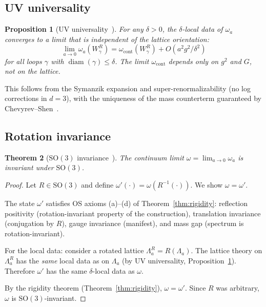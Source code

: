 \documentclass[11pt,a4paper]{article}
\theoremstyle{plain}
\newtheorem{theorem}{Theorem}[section]
\newtheorem{proposition}[theorem]{Proposition}
\theoremstyle{definition}
\theoremstyle{remark}
\newcommand{\diam}{\operatorname{diam}}
\newcommand{\SO}{\mathrm{SO}}
\begin{document}
\subsection{UV universality}

\begin{proposition}[UV universality~\cite{FontesEuclidean}]
\label{prop:uv_univ}
For any $\delta > 0$, the $\delta$-local data of $\omega_a$
converges to a limit that is independent of the
lattice orientation:
\begin{equation}
  \lim_{a \to 0} \omega_a(W_\gamma^R)
  = \omega_{\mathrm{cont}}(W_\gamma^R)
  + O(a^2 g^2 / \delta^2)
\end{equation}
for all loops $\gamma$ with $\diam(\gamma) \le \delta$.
The limit $\omega_{\mathrm{cont}}$ depends only on $g^2$
and $G$, not on the lattice.
\end{proposition}

This follows from the Symanzik expansion and
super-renormalizability (no log corrections in $d=3$),
with the uniqueness of the mass counterterm guaranteed
by Chevyrev--Shen~\cite{CS25}.

\subsection{Rotation invariance}

\begin{theorem}[$\SO(3)$ invariance~\cite{FontesEuclidean}]
\label{thm:rotation}
The continuum limit $\omega = \lim_{a \to 0} \omega_a$
is invariant under $\SO(3)$.
\end{theorem}

\begin{proof}
Let $R \in \SO(3)$ and define $\omega'(\cdot)
= \omega(R^{-1}(\cdot))$. We show $\omega = \omega'$.

The state $\omega'$ satisfies OS axioms (a)--(d) of
Theorem~\ref{thm:rigidity}: reflection positivity
(rotation-invariant property of the construction),
translation invariance (conjugation by $R$),
gauge invariance (manifest), and mass gap
(spectrum is rotation-invariant).

For the local data: consider a rotated lattice
$\Lambda_a^R = R(\Lambda_a)$. The lattice theory
on $\Lambda_a^R$ has the \emph{same} local data
as on $\Lambda_a$ (by UV universality,
Proposition~\ref{prop:uv_univ}). Therefore
$\omega'$ has the same $\delta$-local data as $\omega$.

By the rigidity theorem (Theorem~\ref{thm:rigidity}),
$\omega = \omega'$. Since $R$ was arbitrary,
$\omega$ is $\SO(3)$-invariant.
\end{proof}
\end{document}
